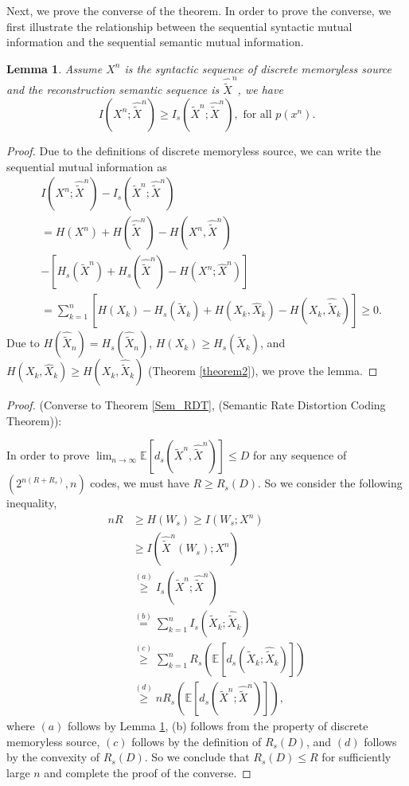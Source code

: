\documentclass[12pt, draftclsnofoot,onecolumn]{IEEEtran}
\newtheorem{lemma}{\bf{Lemma}}
\begin{document}
Next, we prove the converse of the theorem. In order to prove the converse, we first illustrate the relationship between the sequential syntactic mutual information and the sequential semantic mutual information.
\begin{lemma}\label{lemma10}
Assume $X^n$ is the syntactic sequence of discrete memoryless source and the reconstruction semantic sequence is $\hat{\tilde{X}}^n$, we have
\begin{equation}
I(X^n; \hat{\tilde{X}}^n)\geq I_s(\tilde{X}^n;\hat{\tilde{X}}^n), \text{ for all } p(x^n).
\end{equation}
\end{lemma}
\begin{proof}
Due to the definitions of discrete memoryless source, we can write the sequential mutual information as
\begin{equation}
\begin{aligned}
&I(X^n; \hat{\tilde{X}}^n)-I_s(\tilde{X}^n;\hat{\tilde{X}}^n)\\
&=H(X^n)+H(\hat{\tilde{X}}^n)-H(X^n,\hat{\tilde{X}}^n)\\
&-\left[H_s(\tilde{X}^n)+H_s(\hat{\tilde{X}}^n)-H(X^n;\hat{X}^n)\right]\\
&= \sum_{k=1}^{n} \left[H(X_k)-H_s(\tilde{X}_k)+H(X_k,\hat{X}_k)-H(X_k,\hat{\tilde{X}}_k)\right]\geq 0.
\end{aligned}
\end{equation}
Due to $H(\hat{\tilde{X}}_n)=H_s(\hat{\tilde{X}}_n)$, $H(X_k)\geq H_s(\tilde{X}_k)$, and $H(X_k,\hat{X}_k)\geq H(X_k,\hat{\tilde{X}}_k)$ (Theorem \ref{theorem2}), we prove the lemma.
\end{proof}

\begin{proof}(Converse to Theorem \ref{Sem_RDT}, (Semantic Rate Distortion Coding Theorem)):

In order to prove $\lim_{n\to\infty} \mathbb{E} \left[d_s(\tilde{X}^n,\hat{\tilde{X}}^n)\right]\leq D$ for any sequence of $(2^{n(R+R_s)},n)$ codes, we must have $R\geq R_s(D)$. So we consider the following inequality,
\begin{equation}
\begin{aligned}
nR &\geq H(W_s) \geq I(W_s;X^n) \\
     &\geq I(\hat{\tilde{X}}^n(W_s);X^n)\\
     &\overset{(a)}{\geq} I_s(\tilde{X}^n;\hat{\tilde{X}}^n)\\
     &\overset{(b)}{=} \sum_{k=1}^{n} I_s(\tilde{X}_k;\hat{\tilde{X}}_k)\\
     &\overset{(c)}{\geq} \sum_{k=1}^{n} R_s\left(\mathbb{E}\left[d_s(\tilde{X}_k;\hat{\tilde{X}}_k)\right]\right)\\
     &\overset{(d)}{\geq} n R_s\left(\mathbb{E}\left[d_s(\tilde{X}^n;\hat{\tilde{X}}^n)\right]\right),
\end{aligned}
\end{equation}
where $(a)$ follows by Lemma \ref{lemma10}, (b) follows from the property of discrete memoryless source, $(c)$ follows by the definition of $R_s(D)$, and $(d)$ follows by the convexity of $R_s(D)$. So we conclude that $R_s(D)\leq R$ for sufficiently large $n$ and complete the proof of the converse.
\end{proof}
\end{document}
